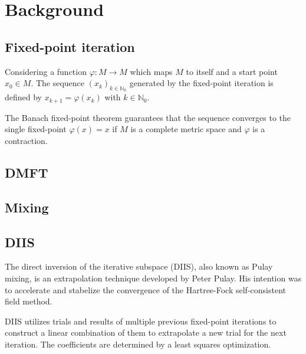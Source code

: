 \chapter{Background}
\label{ch:background}

\section{Fixed-point iteration}

Considering a function \(\varphi\colon M \to M\) which maps \(M\) to itself and a start point \(x_0 \in M\). The sequence \((x_k)_{k \in \mathbb{N}_0}\) generated by the fixed-point iteration is defined by \(x_{k+1} = \varphi(x_k)\) with \(k \in \mathbb{N}_0\).

The Banach fixed-point theorem guarantees that the sequence converges to the single fixed-point \(\varphi(x) = x\) if \(M\) is a complete metric space and \(\varphi\) is a contraction.

\section{DMFT}

\section{Mixing}

\section{DIIS}

The direct inversion of the iterative subspace (DIIS), also known as Pulay mixing, is an extrapolation technique developed by Peter Pulay. His intention was to accelerate and stabelize the convergence of the Hartree-Fock self-consistent field method.

DIIS utilizes trials and results of multiple previous fixed-point iterations to construct a linear combination of them to extrapolate a new trial for the next iteration. The coefficients are determined by a least squares optimization.

